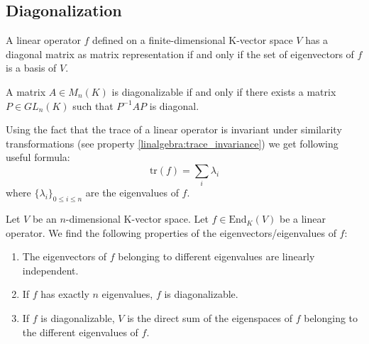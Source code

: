 \subsection{Diagonalization}

    
    	\begin{theorem}\label{linalgebra:theorem:diagonalizable_basis}
	        A linear operator $f$ defined on a finite-dimensional K-vector space $V$ has a diagonal matrix as matrix representation if and only if the set of eigenvectors of $f$ is a basis of $V$.
	\end{theorem}
		
        \begin{theorem}\label{linalgebra:theorem:diagonalizable_PQP}
		A matrix $A\in M_n(K)$ is diagonalizable if and only if there exists a matrix $P\in GL_n(K)$ such that $P^{-1}AP$ is diagonal.
        \end{theorem}
        \begin{result}
        	Using the fact that the trace of a linear operator is invariant under similarity transformations (see property \ref{linalgebra:trace_invariance}) we get following useful formula:
            	\begin{equation}
            		\boxed{\text{tr}(f) = \sum_i\lambda_i}
	        \end{equation}
            	where $\{\lambda_i\}_{0\leq i\leq n}$ are the eigenvalues of $f$.
        \end{result}
        
        \begin{property}\label{linalgebra:diagonalization_properties}
		Let $V$ be an $n$-dimensional K-vector space. Let $f\in \text{End}_K(V)$ be a linear operator. We find the following properties of the eigenvectors/eigenvalues of $f$:
            	\begin{enumerate}
			\item The eigenvectors of $f$ belonging to different eigenvalues are linearly independent.
                	\item If $f$ has exactly $n$ eigenvalues, $f$ is diagonalizable.
                	\item If $f$ is diagonalizable, $V$ is the direct sum of the eigenspaces of $f$ belonging to the different eigenvalues of $f$.
		\end{enumerate}
	\end{property}
        
